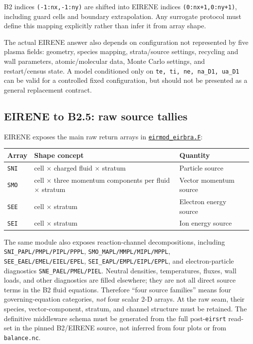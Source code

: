 \documentclass[11pt]{article}
\begin{document}
B2 indices \texttt{(-1:nx,-1:ny)} are shifted into EIRENE indices \texttt{(0:nx+1,0:ny+1)}, including guard cells and boundary extrapolation. Any surrogate protocol must define this mapping explicitly rather than infer it from array shape.

The actual EIRENE answer also depends on configuration not represented by five plasma fields: geometry, species mapping, strata/source settings, recycling and wall parameters, atomic/molecular data, Monte Carlo settings, and restart/census state. A model conditioned only on \texttt{te, ti, ne, na\_D1, ua\_D1} can be valid for a controlled fixed configuration, but should not be presented as a general replacement contract.

\subsection{EIRENE to B2.5: raw source tallies}

EIRENE exposes the main raw return arrays in
\href{https://github.com/iterorganization/EIRENE/blob/f8f63fa0f69d7fb64a7d19f2ec372fd58eb5efc5/src/interfaces/couple_SOLPS-ITER/eirmod_eirbra.F}{\texttt{eirmod\_eirbra.F}}:

\begin{tabularx}{\linewidth}{@{}lYY@{}}
\toprule
Array & Shape concept & Quantity \\
\midrule
\texttt{SNI} & cell $\times$ charged fluid $\times$ stratum & Particle source \\
\texttt{SMO} & cell $\times$ three momentum components per fluid $\times$ stratum & Vector momentum source \\
\texttt{SEE} & cell $\times$ stratum & Electron energy source \\
\texttt{SEI} & cell $\times$ stratum & Ion energy source \\
\bottomrule
\end{tabularx}

The same module also exposes reaction-channel decompositions, including \texttt{SNI\_PAPL/PMPL/PIPL/PPPL}, \texttt{SMO\_MAPL/MMPL/MIPL/MPPL}, \texttt{SEE\_EAEL/EMEL/EIEL/EPEL}, \texttt{SEI\_EAPL/EMPL/EIPL/EPPL}, and electron-particle diagnostics \texttt{SNE\_PAEL/PMEL/PIEL}. Neutral densities, temperatures, fluxes, wall loads, and other diagnostics are filled elsewhere; they are not all direct source terms in the B2 fluid equations. Therefore ``four source families'' means four governing-equation categories, \emph{not} four scalar 2-D arrays. At the raw seam, their species, vector-component, stratum, and channel structure must be retained. The definitive middleware schema must be generated from the full post-\texttt{eirsrt} read-set in the pinned B2/EIRENE source, not inferred from four plots or from \texttt{balance.nc}.
\end{document}
